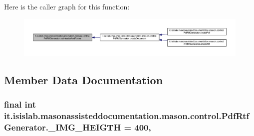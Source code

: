 Here is the caller graph for this function\-:
\nopagebreak
\begin{figure}[H]
\begin{center}
\leavevmode
\includegraphics[width=350pt]{classit_1_1isislab_1_1masonassisteddocumentation_1_1mason_1_1control_1_1_pdf_rtf_generator_add96cb1e39ece24ace1e42aae99082a0_icgraph}
\end{center}
\end{figure}




\subsection{Member Data Documentation}
\hypertarget{classit_1_1isislab_1_1masonassisteddocumentation_1_1mason_1_1control_1_1_pdf_rtf_generator_a10a4f82a6bf2ff579193de7a28c84ac6}{
\subsubsection[{\-\_\-\-I\-M\-G\-\_\-\-H\-E\-I\-G\-T\-H}]{\setlength{\rightskip}{0pt plus 5cm}final int it.\-isislab.\-masonassisteddocumentation.\-mason.\-control.\-Pdf\-Rtf\-Generator.\-\_\-\-I\-M\-G\-\_\-\-H\-E\-I\-G\-T\-H = 400\hspace{0.3cm}{\ttfamily [static]}, {\ttfamily [private]}}}\label{classit_1_1isislab_1_1masonassisteddocumentation_1_1mason_1_1control_1_1_pdf_rtf_generator_a10a4f82a6bf2ff579193de7a28c84ac6}
